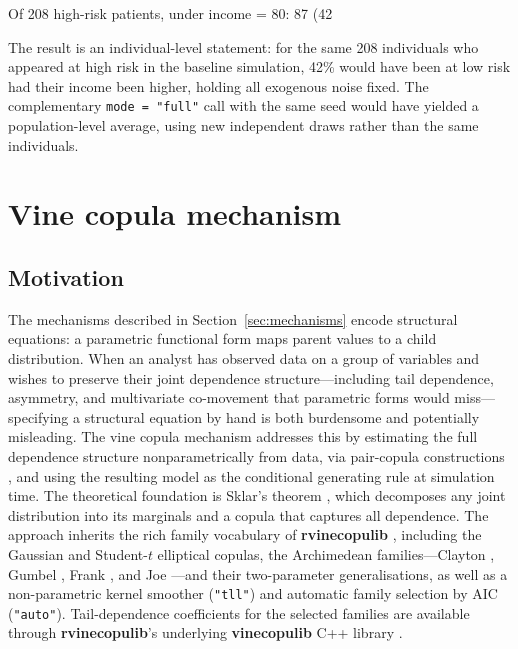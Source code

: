 \documentclass[12pt]{article}
\newcommand{\pkg}[1]{\textbf{#1}}
\newcommand{\code}[1]{\texttt{#1}}
\begin{document}
\begin{CodeOutput}
Of 208 high-risk patients, under income = 80: 87 (42%
\end{CodeOutput}

\noindent
The result is an individual-level statement: for the same 208 individuals who
appeared at high risk in the baseline simulation, 42\% would have been at low risk
had their income been higher, holding all exogenous noise fixed. The complementary
\code{mode = "full"} call with the same seed would have yielded a population-level
average, using new independent draws rather than the same individuals.

\section{Vine copula mechanism}
\label{sec:copula}

\subsection{Motivation}

The mechanisms described in Section~\ref{sec:mechanisms} encode structural
equations: a parametric functional form maps parent values to a child distribution.
When an analyst has observed data on a group of variables and wishes to preserve
their joint dependence structure---including tail dependence, asymmetry, and
multivariate co-movement that parametric forms would miss---specifying a structural
equation by hand is both burdensome and potentially misleading. The vine copula
mechanism addresses this by estimating the full dependence structure nonparametrically
from data, via pair-copula constructions \citep{bedford2002vines, aas2009pair},
and using the resulting model as the conditional generating rule at simulation time.
The theoretical foundation is Sklar's theorem \citep{sklar1959fonctions}, which
decomposes any joint distribution into its marginals and a copula that captures all
dependence. The approach inherits the rich family vocabulary of \pkg{rvinecopulib}
\citep{nagler2022rvinecopulib}, including the Gaussian and Student-$t$ elliptical
copulas, the Archimedean families---Clayton \citep{clayton1978model}, Gumbel
\citep{gumbel1960bivariate}, Frank \citep{frank1979}, and Joe \citep{joe1993}---and
their two-parameter generalisations, as well as a non-parametric kernel smoother
\citep{nagler2016evading} (\code{"tll"}) and automatic family selection by AIC
\citep{czado2019analyzing} (\code{"auto"}). Tail-dependence coefficients for the
selected families are available through \pkg{rvinecopulib}'s underlying
\pkg{vinecopulib} C++ library \citep{joe2014dependence}.
\end{document}
